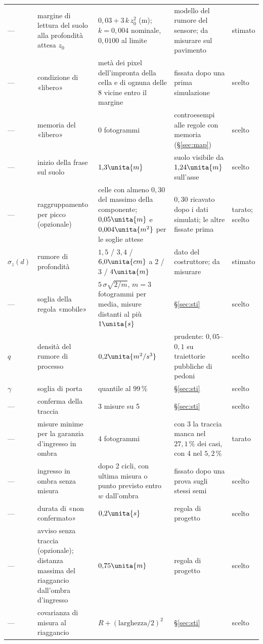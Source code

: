 \begin{table}[H]
\begin{tabularx}{\linewidth}{@{}p{1.25cm}Lp{3.5cm}Lp{1.2cm}@{}}
--- & margine di lettura del suolo alla profondità attesa $z_0$ & $0{,}03+3\,k\,z_0^2$ (m); $k=0{,}004$ nominale, $0{,}0100$ al limite & modello del rumore del sensore; da misurare sul pavimento & stimato\\
--- & condizione di «libero» & metà dei pixel dell'impronta della cella e di ognuna delle 8 vicine entro il margine & fissata dopo una prima simulazione & scelto\\
--- & memoria del «libero» & 0 fotogrammi & controesempi alle regole con memoria (\S\ref{sec:map}) & scelto\\
--- & inizio della frase sul suolo & $1{,}3\unita{m}$ & suolo visibile da $1{,}24\unita{m}$ sull'asse & scelto\\
--- & raggruppamento per picco (opzionale) & celle con almeno $0{,}30$ del massimo della componente; $0{,}05\unita{m}$ e $0{,}004\unita{m^2}$ per le soglie attese & $0{,}30$ ricavato dopo i dati simulati; le altre fissate prima & tarato; scelto\\
$\sigma_z(d)$ & rumore di profondità & $1{,}5$ / $3{,}4$ / $6{,}0\unita{cm}$ a 2 / 3 / $4\unita{m}$ & dato del costruttore; da misurare & stimato\\
--- & soglia della regola «mobile» & $5\,\sigma\sqrt{2/m}$, $m=3$ fotogrammi per media, misure distanti al più $1\unita{s}$ & \S\ref{sec:sti} & scelto\\
$q$ & densità del rumore di processo & $0{,}2\unita{m^2/s^3}$ & prudente: $0{,}05$--$0{,}1$ su traiettorie pubbliche di pedoni & scelto\\
$\gamma$ & soglia di porta & quantile al $99\,\%$ & \S\ref{sec:sti} & scelto\\
--- & conferma della traccia & 3 misure su 5 & \S\ref{sec:sti} & scelto\\
--- & misure minime per la garanzia d'ingresso in ombra & 4 fotogrammi & con 3 la traccia manca nel $27{,}1\,\%$ dei casi, con 4 nel $5{,}2\,\%$ & tarato\\
--- & ingresso in ombra senza misura & dopo 2 cicli, con ultima misura o punto previsto entro $w$ dall'ombra & fissato dopo una prova sugli stessi semi & scelto\\
--- & durata di «non confermato» & $0{,}2\unita{s}$ & regola di progetto & scelto\\
--- & avviso senza traccia (opzionale); distanza massima del riaggancio dall'ombra d'ingresso & $0{,}75\unita{m}$ & regola di progetto & scelto\\
--- & covarianza di misura al riaggancio & $R+(\text{larghezza}/2)^2$ & \S\ref{sec:sti} & scelto\\
\bottomrule
\end{tabularx}
\end{table}

